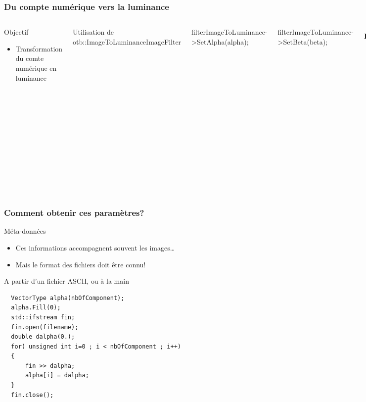 \documentclass[compress]{beamer}
\begin{document}
\begin{frame}

  \frametitle{Du compte numérique vers la luminance}
     \begin{columns}

  \begin{block}{Objectif}
   \begin{itemize}
    \item Transformation du comte numérique en luminance
   \end{itemize}
  \end{block}
  Utilisation de otb::ImageToLuminanceImageFilter

  filterImageToLuminance->SetAlpha(alpha);

  filterImageToLuminance->SetBeta(beta);

  \footnotesize
  \begin{equation*}
   \mathbf{L_{TOA}^{k}} = \frac{ X^{k} } { \alpha_{k} } + \beta_{k}
  \end{equation*}
  \begin{itemize}
  \item $\mathbf{L_{TOA}^{k}}$ est la luminance incidente (en
  $W.m^{-2}.sr^{-1}.\mu m^{-1}$)
  \item $\mathbf{X^{k}}$  comte numérique
  \item $\alpha_{k}$ gain d'étalonnage pour la bande k
  \item $\beta_{k}$ biais d'étalonnage pour la bande k
  \end{itemize}

  \end{columns}
\end{frame}

\begin{frame}[fragile]
  \frametitle{Comment obtenir ces paramètres?}
  \begin{block}{Méta-données}
   \begin{itemize}
    \footnotesize
    \item Ces informations accompagnent souvent les images\ldots
    \item Mais le format des fichiers doit être connu!
   \end{itemize}
  \end{block}
  \begin{block}{A partir d'un fichier ASCII, ou à la main}
  \footnotesize
  \begin{verbatim}
  VectorType alpha(nbOfComponent);
  alpha.Fill(0);
  std::ifstream fin;
  fin.open(filename);
  double dalpha(0.);
  for( unsigned int i=0 ; i < nbOfComponent ; i++)
  {
      fin >> dalpha;
      alpha[i] = dalpha;
  }
  fin.close();
  \end{verbatim}
  \end{block}
\end{frame}
\end{document}
